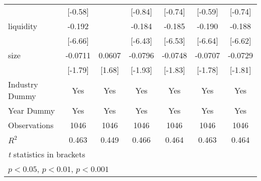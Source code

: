 {\begin{tabular}{l*{6}{c}}
            &     [-0.58]         &                     &     [-0.84]         &     [-0.74]         &     [-0.59]         &     [-0.74]         \\
[1em]
liquidity   &      -0.192\sym{***}&                     &      -0.184\sym{***}&      -0.185\sym{***}&      -0.190\sym{***}&      -0.188\sym{***}\\
            &     [-6.66]         &                     &     [-6.43]         &     [-6.53]         &     [-6.64]         &     [-6.62]         \\
[1em]
size        &     -0.0711         &      0.0607         &     -0.0796         &     -0.0748         &     -0.0707         &     -0.0729         \\
            &     [-1.79]         &      [1.68]         &     [-1.93]         &     [-1.83]         &     [-1.78]         &     [-1.81]         \\
\hline
Industry Dummy&         Yes         &         Yes         &         Yes         &         Yes         &         Yes         &         Yes         \\
Year Dummy  &         Yes         &         Yes         &         Yes         &         Yes         &         Yes         &         Yes         \\
Observations&        1046         &        1046         &        1046         &        1046         &        1046         &        1046         \\
$ R^2 $     &       0.463         &       0.449         &       0.466         &       0.464         &       0.463         &       0.464         \\
\hline\hline
\multicolumn{7}{l}{\footnotesize \textit{t} statistics in brackets}\\
\multicolumn{7}{l}{\footnotesize \sym{*} \(p<0.05\), \sym{**} \(p<0.01\), \sym{***} \(p<0.001\)}\\
\end{tabular}
}
